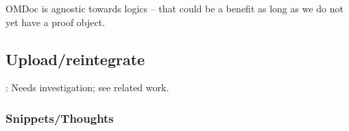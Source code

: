   OMDoc is agnostic towards logics -- that could be a benefit as long as we do
  not yet have a proof object.



\subsection{Upload/reintegrate}: Needs investigation; see related work.

\subsubsection{Snippets/Thoughts}



